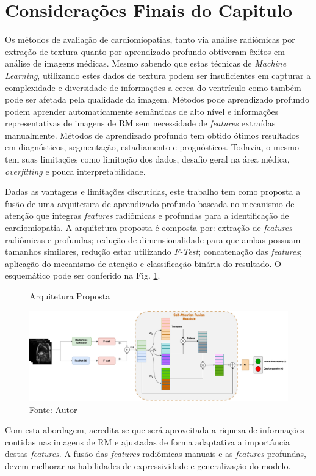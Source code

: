 \section{Considerações Finais do Capitulo}
\label{subsec:rcond_cap_3}

Os métodos de avaliação de cardiomiopatias, tanto via análise radiômicas por extração de textura quanto por aprendizado profundo obtiveram êxitos em análise de imagens médicas. Mesmo sabendo que estas técnicas de \textit{Machine Learning}, utilizando estes dados de textura podem ser insuficientes em capturar a complexidade e diversidade de informações a cerca do ventrículo como também pode ser afetada pela qualidade da imagem. Métodos pode aprendizado profundo podem aprender automaticamente semânticas de alto nível e informações representativas de imagens de RM sem necessidade de \textit{features} extraídas manualmente.
Métodos de aprendizado profundo tem obtido ótimos resultados em diagnósticos, segmentação, estadiamento e prognósticos. Todavia, o mesmo tem suas limitações como limitação dos dados, desafio geral na área médica, \textit{overfitting} e pouca interpretabilidade.

Dadas as vantagens e limitações discutidas, este trabalho tem como proposta a fusão de uma arquitetura de aprendizado profundo baseada no mecanismo de atenção que integras \textit{features} radiômicas e profundas para a identificação de cardiomiopatia. A arquitetura proposta é composta por: extração de \textit{features} radiômicas e profundas; redução de dimensionalidade para que ambas possuam tamanhos similares, redução estar utilizando \textit{F-Test}; concatenação das \textit{features}; aplicação do mecanismo de atenção e classificação binária do resultado. O esquemático pode ser conferido na Fig. \ref{fig:fig011-01}.

\begin{figure}[htbp]
    \centering
    \caption{Arquitetura Proposta}
    \includegraphics[width=1\textwidth]{figures/fig011.png}
    \caption*{Fonte: Autor}
    \label{fig:fig011-01}
\end{figure}

Com esta abordagem, acredita-se que será aproveitada a riqueza de informações contidas nas imagens de RM e ajustadas de forma adaptativa a importância destas \textit{features}. A fusão das \textit{features} radiômicas manuais e as \textit{features} profundas, devem melhorar as habilidades de expressividade e generalização do modelo. 